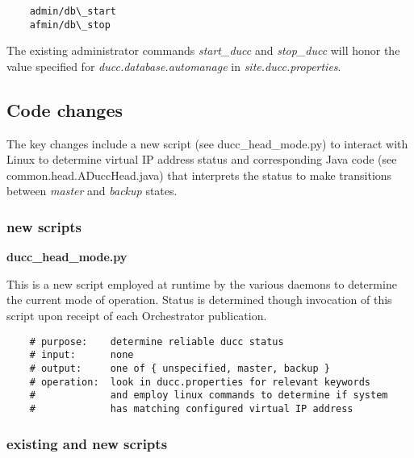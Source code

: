 \documentclass[letterpaper]{article}
\begin{document}
	\begin{verbatim}
	admin/db\_start
	afmin/db\_stop
   	\end{verbatim}
   	
   	The existing administrator commands {\em start\_ducc} and {\em stop\_ducc} will
   	honor the value specified for {\em ducc.database.automanage} in {\em site.ducc.properties}.

\subsection{Code changes}

The key changes include a new script (see ducc\_head\_mode.py) to 
interact with Linux to determine virtual IP address status and 
corresponding Java code (see common.head.ADuccHead.java)
that interprets the status to make transitions between 
{\em master} and {\em backup} states.

\subsubsection{new scripts}

\textbf{ducc\_head\_mode.py}

This is a new script employed at runtime by the various daemons to
determine the current mode of operation.  Status is determined 
though invocation of this script upon receipt of each Orchestrator
publication.

   \begin{verbatim}
    # purpose:    determine reliable ducc status
    # input:      none
    # output:     one of { unspecified, master, backup }
    # operation:  look in ducc.properties for relevant keywords
    #             and employ linux commands to determine if system
    #             has matching configured virtual IP address
   \end{verbatim}

\subsubsection{existing and new scripts}
\end{document}
